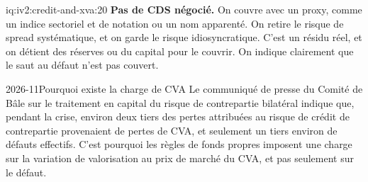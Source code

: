 \begin{solution}{iq:iv2:credit-and-xva:20}
\textbf{Pas de CDS négocié.} On couvre avec un proxy, comme un indice sectoriel et de notation ou un nom apparenté. On retire le risque de spread systématique, et on garde le risque idiosyncratique. C'est un résidu réel, et on détient des réserves ou du capital pour le couvrir. On indique clairement que le saut au défaut n'est pas couvert.

\begin{dated}{2026-11}{Pourquoi existe la charge de CVA}\label{dat:iv2:credit-and-xva:cva}
Le communiqué de presse du Comité de Bâle sur le traitement en capital du risque de contrepartie bilatéral indique que, pendant la crise, environ deux tiers des pertes attribuées au risque de crédit de contrepartie provenaient de pertes de CVA, et seulement un tiers environ de défauts effectifs. C'est pourquoi les règles de fonds propres imposent une charge sur la variation de valorisation au prix de marché du CVA, et pas seulement sur le défaut.
\end{dated}

\end{solution}
